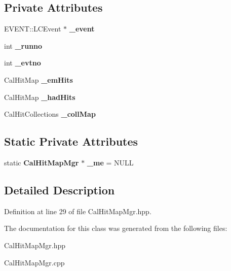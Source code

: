 \subsection*{Private Attributes}
\begin{DoxyCompactItemize}
\item 
E\-V\-E\-N\-T\-::\-L\-C\-Event $\ast$ {\bfseries \-\_\-event}\label{classCalHitMapMgr_aa525fbd232694ae809c61eb4dd5e6048}

\item 
int {\bfseries \-\_\-runno}\label{classCalHitMapMgr_a2d631e3c16083f00bf82ebecec2f809c}

\item 
int {\bfseries \-\_\-evtno}\label{classCalHitMapMgr_a7cb32f55ac08d4020495787b1a35a03d}

\item 
Cal\-Hit\-Map {\bfseries \-\_\-em\-Hits}\label{classCalHitMapMgr_ad7eb8893b8b58013bf7af9ff96c6dacd}

\item 
Cal\-Hit\-Map {\bfseries \-\_\-had\-Hits}\label{classCalHitMapMgr_a9c2627d8456cc339d0e8ed02760c809c}

\item 
Cal\-Hit\-Collections {\bfseries \-\_\-coll\-Map}\label{classCalHitMapMgr_ab2218c79ccb9f434bace784e2aed2324}

\end{DoxyCompactItemize}
\subsection*{Static Private Attributes}
\begin{DoxyCompactItemize}
\item 
static {\bf Cal\-Hit\-Map\-Mgr} $\ast$ {\bfseries \-\_\-me} = N\-U\-L\-L\label{classCalHitMapMgr_a99b8aa53524ca9811a7a0d32684a1aee}

\end{DoxyCompactItemize}


\subsection{Detailed Description}


Definition at line 29 of file Cal\-Hit\-Map\-Mgr.\-hpp.



The documentation for this class was generated from the following files\-:\begin{DoxyCompactItemize}
\item 
Cal\-Hit\-Map\-Mgr.\-hpp\item 
Cal\-Hit\-Map\-Mgr.\-cpp\end{DoxyCompactItemize}
